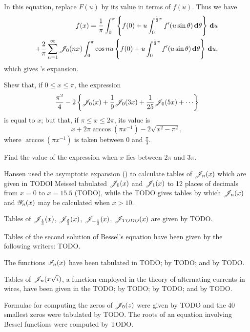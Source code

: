 In this equation, replace $F(u)$ by its value in terms of $f(u)$. Thus
we have
\begin{align*}
  f(x)
  =
  \frac{1}{\pi}
  \int_{0}^{\pi}
  \left\{ 
    f(0) + u \int_{0}^{\frac{1}{2}\pi} f'(u\sin\theta) \, \mathbf{d}\theta
   \right\}
  \, \mathbf{d} u
  \\
  +
  \frac{2}{\pi}
  \sum_{n=1}^{\infty}
  \mathscr{J}_{0}(nx)
  \int_{0}^{\pi}
  \cos nu
  \left\{ 
    f(0) + u \int_{0}^{\frac{1}{2}\pi} f'(u\sin\theta) \, \mathbf{d}\theta
   \right\}
  \, \mathbf{d} u,
\end{align*}
which gives \Schlomilch's expansion.
\begin{wandwexample}
  Shew that, if $0 \leq x \leq \pi$, the expression
  $$
  \frac{\pi^{2}}{4}
  -
  2
  \thebrace{
    \besJ_{0}(x)
    + \frac{1}{9} \besJ_{0}(3x)
    + \frac{1}{25} \besJ_{0}(5x)
    + \cdots
  }
  $$
  is equal to $x$; but that, if $\pi \leq x \leq 2\pi$, its value is
  $$
  x
  +
  2\pi \arccos (\pi x^{-1})
  -
  2 \sqrt{x^{2} - \pi^{2}},
  $$
  where $\arccos(\pi x^{-1})$ is taken between $0$ and
  $\frac{\pi}{3}$.

  Find the value of the expression when $x$ lies between $2\pi$ and
  $3\pi$.
\end{wandwexample}

Hansen used the asymptotic expansion () to
calculate tables of $\mathscr{J}_{n}(x)$ which are given in TODOl
Meissel tabulated $\mathscr{J}_{0}(x)$ and $\mathscr{J}_{1}(x)$ to 12 places of
decimals from $x=0$ to $x = 15.5$ (TODO), while the TODO gives tables
by which $\mathscr{J}_{n}(x)$ and $\mathscr{Y}_{n}(x)$ may be calculated when $x >
10$.

Tables of $\mathscr{J}_{\frac{1}{3}}(x)$, $\mathscr{J}_{\frac{2}{3}}(x)$,
$\mathscr{J}_{-\frac{1}{3}}(x)$, $\mathscr{J}_{TODO}(x)$ are given by TODO.

Tables of the second solution of Bessel's equation have been given by
the following writers: TODO.

The functions $\mathscr{I}_{n}(x)$ have been tabulated in TODO; by TODO; and
by TODO.

Tables of $\mathscr{J}_{n}(x \sqrt{i})$, a function employed in the theory of
alternating currents in wires, have been given in the TODO; by TODO;
by TODO; and by TODO.

Formulae for computing the zeros of $\mathscr{J}_{0}(z)$ were given by TODO
and the 40 smallest zeros were tabulated by TODO. The roots of an
equation involving Bessel functions were computed by TODO.

